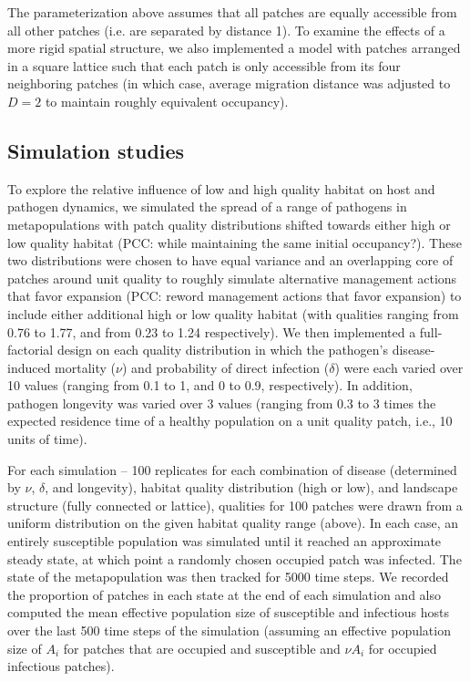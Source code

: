 \documentclass{article}
\begin{document}
The parameterization above assumes that all patches are equally accessible from all other patches (i.e. are separated by distance 1).  To examine the effects of a more rigid spatial structure, we also implemented a model with patches arranged in a square lattice such that each patch is only accessible from its four neighboring patches (in which case, average migration distance was adjusted to $D = 2$ to maintain roughly equivalent occupancy).  

\subsection{Simulation studies}

To explore the relative influence of low and high quality habitat on host and pathogen dynamics, we simulated the spread of a range of pathogens in metapopulations with patch quality distributions shifted towards either high or low quality habitat (PCC: while maintaining the same initial occupancy?).
These two distributions were chosen to have equal variance and an overlapping core of patches around unit quality to roughly simulate alternative management actions that favor expansion (PCC: reword management actions that favor expansion) to include either additional high or low quality habitat (with qualities ranging from 0.76 to 1.77, and from 0.23 to 1.24 respectively).  
We then implemented a full-factorial design on each quality distribution in which the pathogen's disease-induced mortality ($\nu$) and probability of direct infection ($\delta$) were each varied over 10 values (ranging from 0.1 to 1, and 0 to 0.9, respectively).  In addition, pathogen longevity was varied over 3 values (ranging from 0.3 to 3 times the expected residence time of a healthy population on a unit quality patch, i.e., 10 units of time).

For each simulation -- 100 replicates for each combination of disease (determined by $\nu$, $\delta$, and longevity), habitat quality distribution (high or low), and landscape structure (fully connected or lattice), qualities for 100 patches were drawn from a uniform distribution on the given habitat quality range (above). In each case, an entirely susceptible population was simulated until it reached an approximate steady state, at which point a randomly chosen occupied patch was infected.  The state of the metapopulation was then tracked for 5000 time steps.  We recorded the proportion of patches in each state at the end of each simulation and also computed the mean effective population size of susceptible and infectious hosts over the last 500 time steps of the simulation (assuming an effective population size of $A_i$ for patches that are occupied and susceptible and $\nu A_i$ for occupied infectious patches).    
\end{document}
